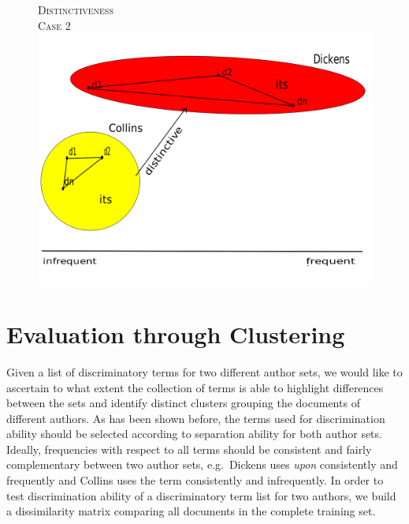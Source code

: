 \documentclass[a4paper,10pt,twoside,fleqn]{article}
\begin{document}
\begin{figure}[!htb]
\endminipage\hfill
{}%
\sf \textsc{Distinctiveness} \\
{\scriptsize \textsc{Case 2}}\\
  \includegraphics[scale=0.2,width=\linewidth]{figures/distinc2-fin.png}
 \endminipage
\end{figure}
 
 
 
 
 
 
 
 
\section{Evaluation through Clustering}

Given a list of discriminatory terms for two different author sets, we would like to ascertain to what extent the collection of terms is able to 
highlight differences between the sets and identify distinct clusters grouping the documents of different authors. 
As has been shown before, the terms used for discrimination ability should be selected according to separation ability for both author sets. 
Ideally, frequencies with respect to all terms should be consistent and fairly complementary between two author sets, e.g.~Dickens uses \emph{upon} 
consistently and frequently and Collins uses the term consistently and infrequently. 
In order to test discrimination ability of a discriminatory term list for two authors, we build a dissimilarity matrix comparing all documents in 
the complete training set. 
\end{document}
